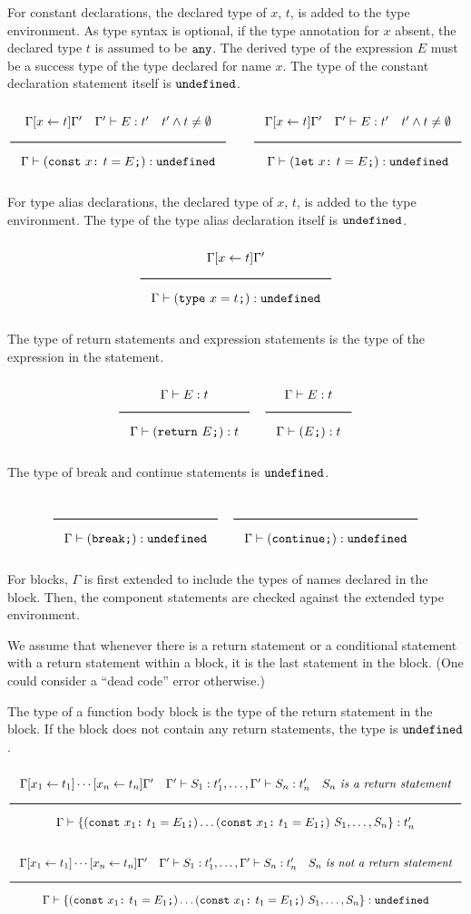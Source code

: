 For constant declarations, the declared type of $x$, $t$, is added to the type environment.
As type syntax is optional, if the type annotation for $x$ absent, the declared type $t$ is assumed to be $\texttt{any}$.
The derived type of the expression $E$ must be a success type of the type declared for name $x$.
The type of the constant declaration statement itself is $\texttt{undefined}$.

\noindent
\[
  \Rule{\Gamma [x \leftarrow t] \Gamma' \quad \Gamma' \vdash E : t' \quad t' \wedge t \neq \emptyset}{
    \Gamma \vdash (\texttt{const}\ x \texttt{:}\ t = E\texttt{;}) : \Undefined}
  \qquad
  \Rule{\Gamma [x \leftarrow t] \Gamma' \quad \Gamma' \vdash E : t' \quad t' \wedge t \neq \emptyset}{
    \Gamma \vdash (\texttt{let}\ x \texttt{:}\ t = E\texttt{;}) : \Undefined}
\]
\noindent

For type alias declarations, the declared type of $x$, $t$, is added to the type environment.
The type of the type alias declaration itself is $\texttt{undefined}$.

\noindent
\[
  \Rule{\Gamma [x \leftarrow t] \Gamma'}{\Gamma \vdash (\texttt{type}\ x = t\texttt{;}) : \Undefined}
\]
\noindent

The type of return statements and expression statements is the type of the expression in the statement.

\noindent
\[
  \Rule{\Gamma \vdash E : t}{\Gamma \vdash (\texttt{return}\ E\texttt{;}) : t}
  \quad
  \Rule{\Gamma \vdash E : t}{\Gamma \vdash (E\texttt{;}) : t}
\]
\noindent

The type of break and continue statements is $\texttt{undefined}$.

\noindent
\[
  \Rule{}{\Gamma \vdash (\texttt{break} \texttt{;}) : \Undefined}
  \quad
  \Rule{}{\Gamma \vdash (\texttt{continue} \texttt{;}) : \Undefined}
\]
\noindent

For blocks, $\Gamma$ is first extended to include the types of names declared in the block.
Then, the component statements are checked against the extended type environment.

We assume that whenever there is a return statement or a conditional statement with a return statement within a
block, it is the last statement in the block. (One could consider a ``dead code'' error otherwise.)

The type of a function body block is the type of the return statement in the block.
If the block does not contain any return statements, the type is $\texttt{undefined}$.

\noindent
\[
  \Rule{\Gamma [x_1 \leftarrow t_1] \cdots [x_n \leftarrow t_n] \Gamma' \quad
    \Gamma' \vdash S_1 : t'_1, \ldots, \Gamma' \vdash S_n : t'_n \quad S_n\ \textit{is a return statement}}{
    \Gamma \vdash \{ (\texttt{const}\ x_1 \texttt{:}\ t_1 = E_1\texttt{;}) \ldots (\texttt{const}\ x_1 \texttt{:}\ t_1 = E_1\texttt{;})\
    S_1, \ldots, S_n\} : t'_n}
\]
\noindent
\[
  \Rule{\Gamma [x_1 \leftarrow t_1] \cdots [x_n \leftarrow t_n] \Gamma' \quad
    \Gamma' \vdash S_1 : t'_1, \ldots, \Gamma' \vdash S_n : t'_n \quad S_n\ \textit{is not a return statement}}{
    \Gamma \vdash \{ (\texttt{const}\ x_1 \texttt{:}\ t_1 = E_1\texttt{;}) \ldots (\texttt{const}\ x_1 \texttt{:}\ t_1 = E_1\texttt{;})\
    S_1, \ldots, S_n\} : \Undefined}
\]
\noindent

